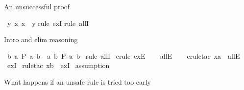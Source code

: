 \begin{isabellebody}
\isamarkupfalse%
%
\endisatagproof
{\isafoldproof}%
%
\isadelimproof
%
\endisadelimproof
%
\begin{isamarkuptext}%
An unsuccessful proof%
\end{isamarkuptext}\isamarkuptrue%
\isamarkupfalse%
\ {\isachardoublequoteopen}{\isasymexists}y{\isachardot}{\kern0pt}\ {\isasymforall}x{\isachardot}{\kern0pt}\ x\ {\isacharequal}{\kern0pt}\ y{\isachardoublequoteclose}\isanewline
%
\isadelimproof
%
\endisadelimproof
%
\isatagproof
{}\isamarkupfalse%
{\isacharparenleft}{\kern0pt}rule\ exI{\isacharparenright}{\kern0pt}\isanewline
{}\isamarkupfalse%
{\isacharparenleft}{\kern0pt}rule\ allI{\isacharparenright}{\kern0pt}\isanewline
{}\isamarkupfalse%
%
\endisatagproof
{\isafoldproof}%
%
\isadelimproof
%
\endisadelimproof
%
\begin{isamarkuptext}%
Intro and elim reasoning%
\end{isamarkuptext}\isamarkuptrue%
\isamarkupfalse%
\ {\isachardoublequoteopen}{\isasymexists}b{\isachardot}{\kern0pt}\ {\isasymforall}a{\isachardot}{\kern0pt}\ P\ a\ b\ {\isasymLongrightarrow}\ {\isasymforall}a{\isachardot}{\kern0pt}\ {\isasymexists}b{\isachardot}{\kern0pt}\ P\ a\ b{\isachardoublequoteclose}\isanewline
%
\isadelimproof
\isanewline
%
\endisadelimproof
%
\isatagproof
{}\isamarkupfalse%
\ {\isacharparenleft}{\kern0pt}rule\ allI{\isacharparenright}{\kern0pt}\isanewline
{}\isamarkupfalse%
\ {\isacharparenleft}{\kern0pt}erule\ exE{\isacharparenright}{\kern0pt}\isanewline
\isanewline
\ \ \isamarkupfalse%
\ allE\isanewline
\ \ \isamarkupfalse%
\ {\isacharparenleft}{\kern0pt}erule{\isacharunderscore}{\kern0pt}tac\ x{\isacharequal}{\kern0pt}{\isachardoublequoteopen}a{\isachardoublequoteclose}\ \ allE{\isacharparenright}{\kern0pt}\isanewline
\ \ \isamarkupfalse%
\ exI\isanewline
{}\isamarkupfalse%
\ {\isacharparenleft}{\kern0pt}rule{\isacharunderscore}{\kern0pt}tac\ x{\isacharequal}{\kern0pt}{\isachardoublequoteopen}b{\isachardoublequoteclose}\ \ exI{\isacharparenright}{\kern0pt}\isanewline
{}\isamarkupfalse%
\ assumption\isanewline
{}\isamarkupfalse%
%
\endisatagproof
{\isafoldproof}%
%
\isadelimproof
%
\endisadelimproof
%
\begin{isamarkuptext}%
What happens if an unsafe rule is tried too early%
\end{isamarkuptext}\isamarkuptrue%

\end{isabellebody}

